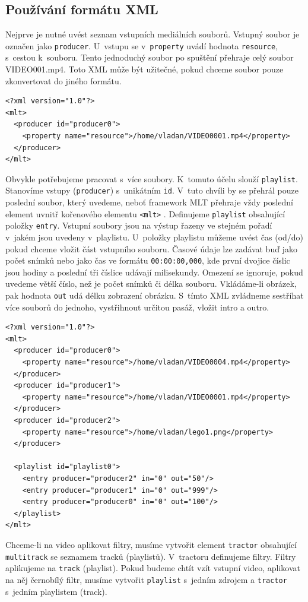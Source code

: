 \subsection{Používání formátu XML}
Nejprve je nutné uvést seznam vstupních mediálních souborů. Vstupný soubor je označen jako \texttt{producer}. U~vstupu se v~\texttt{property} uvádí hodnota \texttt{resource}, s~cestou k~souboru. Tento jednoduchý soubor po spuštění přehraje celý soubor VIDEO001.mp4. Toto XML může být užitečné, pokud chceme soubor pouze zkonvertovat do jiného formátu.
\begin{lstlisting}[style=xml]
<?xml version="1.0"?>
<mlt>
  <producer id="producer0">
    <property name="resource">/home/vladan/VIDEO0001.mp4</property>
  </producer>
</mlt>
\end{lstlisting}
Obvykle potřebujeme pracovat s~více soubory. K~tomuto účelu slouží \texttt{playlist}. Stanovíme vstupy (\texttt{producer}) s~unikátním \texttt{id}. V~tuto chvíli by se přehrál pouze poslední soubor, který uvedeme, neboť framework MLT přehraje vždy poslední element uvnitř kořenového elementu \texttt{<mlt>} . Definujeme \texttt{playlist} obsahující položky \texttt{entry}. Vstupní soubory jsou na výstup řazeny ve stejném pořadí v~jakém jsou uvedeny v~playlistu. U~položky playlistu můžeme uvést čas (od/do) pokud chceme vložit část vstupního souboru. Časové údaje lze zadávat buď jako počet snímků nebo jako čas ve formátu \texttt{00:00:00,000}, kde první dvojice číslic jsou hodiny a poslední tři číslice udávají milisekundy. Omezení se ignoruje, pokud uvedeme větší číslo, než je počet snímků či délka souboru. Vkládáme-li obrázek, pak hodnota \texttt{out} udá délku zobrazení obrázku. S~tímto XML zvládneme sestříhat více souborů do jednoho, vystřihnout určitou pasáž, vložit intro a outro.
\begin{lstlisting}[style=xml]
<?xml version="1.0"?>
<mlt>
  <producer id="producer0">
    <property name="resource">/home/vladan/VIDEO0004.mp4</property>
  </producer>
  <producer id="producer1">
    <property name="resource">/home/vladan/VIDEO0001.mp4</property>
  </producer>
  <producer id="producer2">
    <property name="resource">/home/vladan/lego1.png</property>
  </producer>

  <playlist id="playlist0">
    <entry producer="producer2" in="0" out="50"/>
    <entry producer="producer1" in="0" out="999"/>
    <entry producer="producer0" in="0" out="100"/>
  </playlist>
</mlt>
\end{lstlisting}
Chceme-li na video aplikovat filtry, musíme vytvořit element \texttt{tractor} obsahující \texttt{multitrack} se seznamem tracků (playlistů). V~tractoru definujeme filtry. Filtry aplikujeme na \texttt{track} (playlist). Pokud budeme chtít vzít vstupní video, aplikovat na něj černobílý filtr, musíme vytvořit \texttt{playlist} s~jedním zdrojem a \texttt{tractor} s~jedním playlistem (track).
